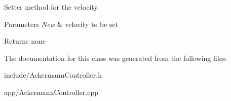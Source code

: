 Setter method for the velocity. 


\begin{DoxyParams}{Parameters}
{\em New} & velocity to be set \\
\hline
\end{DoxyParams}
\begin{DoxyReturn}{Returns}
none 
\end{DoxyReturn}


The documentation for this class was generated from the following files\+:\begin{DoxyCompactItemize}
\item 
include/Ackermann\+Controller.\+h\item 
app/Ackermann\+Controller.\+cpp\end{DoxyCompactItemize}

